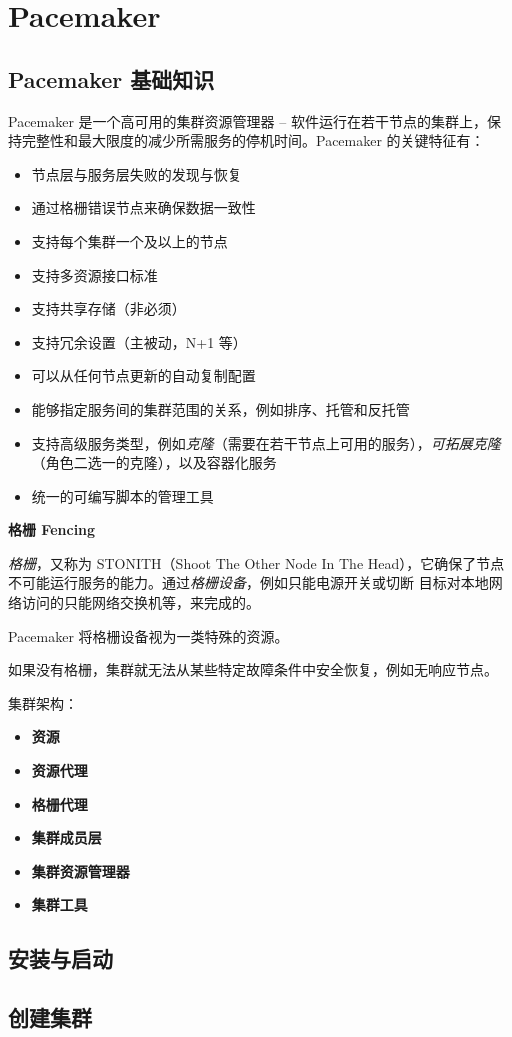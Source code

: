 \documentclass[UTF8]{ctexart}
\begin{document}
\newpage
\section{Pacemaker}

\subsection{Pacemaker 基础知识}

Pacemaker 是一个高可用的集群资源管理器 -- 软件运行在若干节点的集群上，保持完整性和最大限度的减少所需服务的停机时间。Pacemaker 的关键特征有：

\begin{itemize}
	\item 节点层与服务层失败的发现与恢复
	\item 通过格栅错误节点来确保数据一致性
	\item 支持每个集群一个及以上的节点
	\item 支持多资源接口标准
	\item 支持共享存储（非必须）
	\item 支持冗余设置（主被动，N+1 等）
	\item 可以从任何节点更新的自动复制配置
	\item 能够指定服务间的集群范围的关系，例如排序、托管和反托管
	\item 支持高级服务类型，例如\textit{克隆}（需要在若干节点上可用的服务），\textit{可拓展克隆}（角色二选一的克隆），以及容器化服务
	\item 统一的可编写脚本的管理工具
\end{itemize}

\begin{anote}
	\textbf{格栅 Fencing}\bigskip

	\textit{格栅}，又称为 STONITH（Shoot The Other Node In The Head），它确保了节点不可能运行服务的能力。通过\textit{格栅设备}，例如只能电源开关或切断
	目标对本地网络访问的只能网络交换机等，来完成的。

	Pacemaker 将格栅设备视为一类特殊的资源。

	如果没有格栅，集群就无法从某些特定故障条件中安全恢复，例如无响应节点。
\end{anote}

集群架构：

\begin{itemize}
	\item \textbf{资源}
	\item \textbf{资源代理}
	\item \textbf{格栅代理}
	\item \textbf{集群成员层}
	\item \textbf{集群资源管理器}
	\item \textbf{集群工具}
\end{itemize}

\subsection{安装与启动}


\subsection{创建集群}

\end{document}

